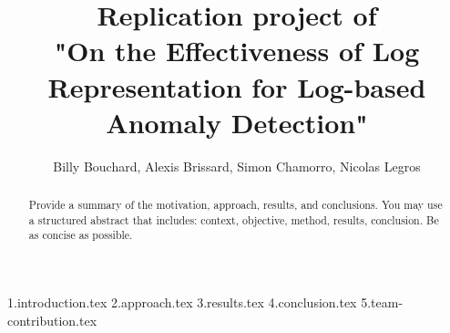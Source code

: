 \documentclass[10pt, conference]{IEEEtran}
\title{Replication project of \\
"On the Effectiveness of Log Representation for Log-based Anomaly Detection"}
\author{Billy Bouchard, Alexis Brissard, Simon Chamorro, Nicolas Legros}
\begin{document}
\maketitle

\begin{abstract}
Provide a summary of the motivation, approach, results, and conclusions. You may use a structured abstract that includes: context, objective, method, results, conclusion.
Be as concise as possible.
\end{abstract}


{1.introduction.tex}
{2.approach.tex}
{3.results.tex}
{4.conclusion.tex}
{5.team-contribution.tex}


\balance


\end{document}

